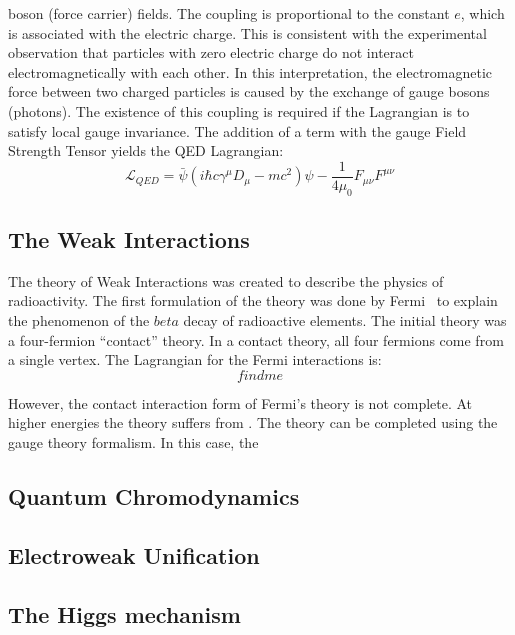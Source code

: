 boson (force carrier) fields.  The coupling is proportional to the constant
$e$, which is associated with the electric charge.  This is consistent with the
experimental observation that particles with zero electric charge do not
interact electromagnetically with each other.  In this interpretation, the
electromagnetic force between two charged particles is caused by the exchange
of gauge bosons (photons).  The existence of this coupling is required if the
Lagrangian is to satisfy local gauge invariance. The addition of a term with
the gauge Field Strength Tensor yields the QED Lagrangian:
\begin{equation}
  \mathcal{L}_{QED} = \bar \psi (i\hbar c\gamma^\mu D_\mu - mc^2) \psi -
  \frac{1}{4\mu_0}F_{\mu\nu}F^{\mu\nu}
\end{equation}

\subsection{The Weak Interactions}

The theory of Weak Interactions was created to describe the physics of
radioactivity.  The first formulation of the theory was done by
Fermi~\cite{ref:FermiWeakInteration} to explain the phenomenon of the $beta$ decay
of radioactive elements.  The initial theory was a four-fermion ``contact''
theory.  In a contact theory, all four fermions come from a single vertex.
The Lagrangian for the Fermi interactions is:
\begin{equation}
 find me 
\end{equation}

However, the contact interaction form of Fermi's theory is not complete.  At 
higher energies the theory suffers from .  The theory can 
be completed using the gauge theory formalism.  In this case, the 


\subsection{Quantum Chromodynamics}

\subsection{Electroweak Unification}

\subsection{The Higgs mechanism}

